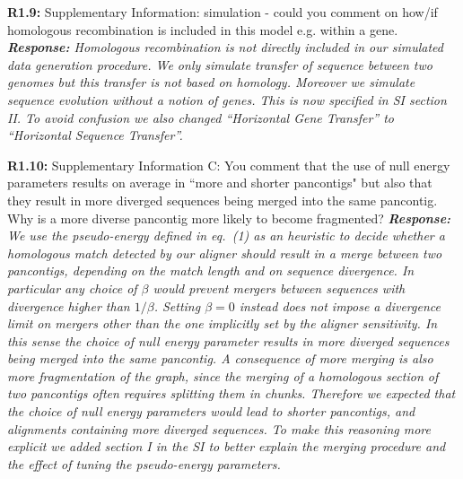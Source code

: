 \documentclass[aps,rmp,onecolumn]{revtex4-1}
\newcommand{\Marco}[1]{{\color{orange}Marco: #1}}
\newcommand{\Liam}[1]{{\color{teal}Liam: #1}}
\newcommand{\reviewer}[2]{\textbf{#1:} #2\vskip 5mm}
\newcommand{\response}[1]{{\it {\color{response}\textbf{Response:} #1}}\vskip 5mm}
\begin{document}
\reviewer{R1.9}{Supplementary Information: simulation - could you comment on how/if homologous recombination is included in this model e.g. within a gene.}
\response{Homologous recombination is not directly included in our simulated data generation procedure. We only simulate transfer of sequence between two genomes but this transfer is not based on homology. Moreover we simulate sequence evolution without a notion of genes. This is now specified in SI section II. To avoid confusion we also changed ``Horizontal Gene Transfer'' to ``Horizontal Sequence Transfer''.}

\reviewer{R1.10}{Supplementary Information C: You comment that the use of null energy parameters results on average in ``more and shorter pancontigs" but also that they result in more diverged sequences being merged into the same pancontig. Why is a more diverse pancontig more likely to become fragmented?}
\response{We use the pseudo-energy defined in eq.~(1) as an heuristic to decide whether a homologous match detected by our aligner should result in a merge between two pancontigs, depending on the match length and on sequence divergence. In particular any choice of $\beta$ would prevent mergers between sequences with divergence higher than $1/\beta$. Setting $\beta=0$ instead does not impose a divergence limit on mergers other than the one implicitly set by the aligner sensitivity. In this sense the choice of null energy parameter results in more diverged sequences being merged into the same pancontig. A consequence of more merging is also more fragmentation of the graph, since the merging of a homologous section of two pancontigs often requires splitting them in chunks. Therefore we expected that the choice of null energy parameters would lead to shorter pancontigs, and alignments containing more diverged sequences.
      To make this reasoning more explicit we added section I in the SI to better explain the merging procedure and the effect of tuning the pseudo-energy parameters.}
\end{document}
